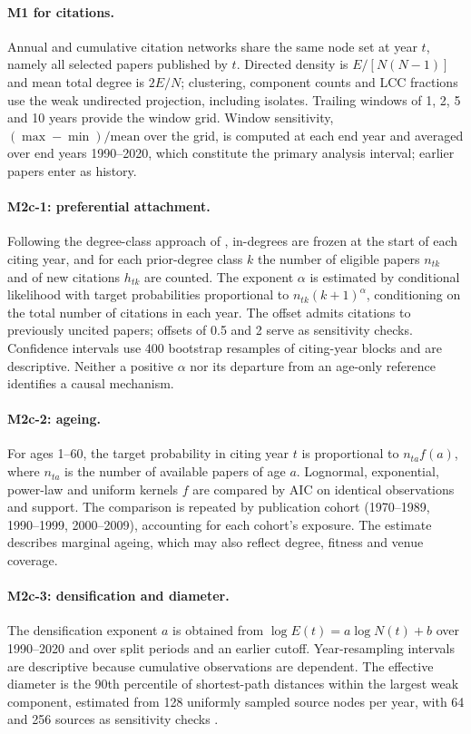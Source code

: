 \paragraph{M1 for citations.}
Annual and cumulative citation networks share the same node set at year $t$, namely all
selected papers published by $t$. Directed density is $E/[N(N-1)]$ and mean total degree
is $2E/N$; clustering, component counts and LCC fractions use the weak undirected
projection, including isolates. Trailing windows of 1, 2, 5 and 10 years provide the
window grid. Window sensitivity, $(\max-\min)/\mathrm{mean}$ over the grid, is computed at
each end year and averaged over end years 1990--2020, which constitute the primary
analysis interval; earlier papers enter as history.

\paragraph{M2c-1: preferential attachment.}
Following the degree-class approach of \citet{jeong2003measuring}, in-degrees are frozen
at the start of each citing year, and for each prior-degree class $k$ the number of
eligible papers $n_{tk}$ and of new citations $h_{tk}$ are counted. The exponent $\alpha$
is estimated by conditional likelihood with target probabilities proportional to
$n_{tk}(k+1)^\alpha$, conditioning on the total number of citations in each year. The
offset admits citations to previously uncited papers; offsets of 0.5 and 2 serve as
sensitivity checks. Confidence intervals use 400 bootstrap resamples of citing-year blocks
and are descriptive. Neither a positive $\alpha$ nor its departure from an age-only
reference identifies a causal mechanism.

\paragraph{M2c-2: ageing.}
For ages 1--60, the target probability in citing year $t$ is proportional to
$n_{ta}f(a)$, where $n_{ta}$ is the number of available papers of age $a$. Lognormal,
exponential, power-law and uniform kernels $f$ are compared by AIC on identical
observations and support. The comparison is repeated by publication cohort (1970--1989,
1990--1999, 2000--2009), accounting for each cohort's exposure. The estimate describes
marginal ageing, which may also reflect degree, fitness and venue coverage.

\paragraph{M2c-3: densification and diameter.}
The densification exponent $a$ is obtained from $\log E(t)=a\log N(t)+b$ over 1990--2020
and over split periods and an earlier cutoff. Year-resampling intervals are descriptive
because cumulative observations are dependent. The effective diameter is the 90th
percentile of shortest-path distances within the largest weak component, estimated from
128 uniformly sampled source nodes per year, with 64 and 256 sources as sensitivity checks
\citep{leskovec2005graphs}.


